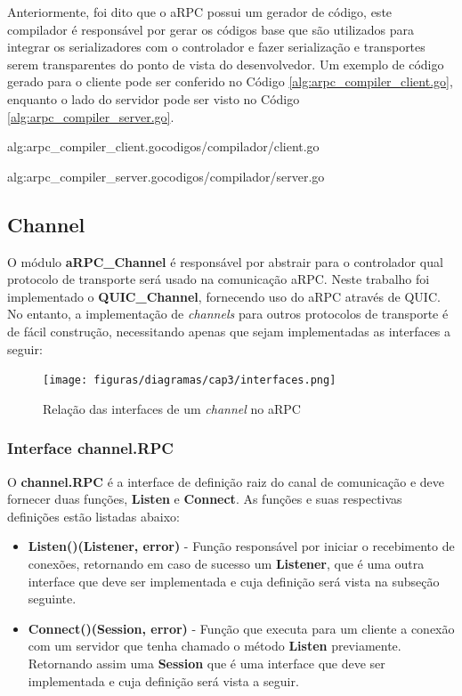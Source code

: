 Anteriormente, foi dito que o aRPC possui um gerador de código, este compilador é responsável por gerar os códigos base que são utilizados para integrar os serializadores com o controlador e fazer serialização e transportes serem transparentes do ponto de vista do desenvolvedor. Um exemplo de código gerado para o cliente pode ser conferido no Código \ref{alg:arpc_compiler_client.go}, enquanto o lado do servidor pode ser visto no Código \ref{alg:arpc_compiler_server.go}.

 {alg:arpc_compiler_client.go}{codigos/compilador/client.go}{}

 {alg:arpc_compiler_server.go}{codigos/compilador/server.go}{}

\subsection{Channel}

O módulo \textbf{aRPC\_Channel} é responsável por abstrair para o controlador qual protocolo de transporte será usado na comunicação aRPC. Neste trabalho foi implementado o \textbf{QUIC\_Channel}, fornecendo uso do aRPC através de QUIC. No entanto, a implementação de \textit{channels} para outros protocolos de transporte é de fácil construção, necessitando apenas que sejam implementadas as interfaces a seguir: 

\begin{figure}[ht]
    \centering
    \caption{Relação das interfaces de um \textit{channel} no aRPC}
    \texttt{[image: figuras/diagramas/cap3/interfaces.png]} 
    \label{fig:arpc_channel_interfaces}
\end{figure}

\subsubsection{Interface channel.RPC}

O \textbf{channel.RPC} é a interface de definição raiz do canal de comunicação e deve fornecer duas funções, \textbf{Listen} e \textbf{Connect}. As funções e suas respectivas definições estão listadas abaixo:

\begin{itemize}
	\item \textbf{Listen()(Listener, error)} - Função responsável por iniciar o recebimento de conexões, retornando em caso de sucesso um \textbf{Listener}, que é uma outra interface que deve ser implementada e cuja definição será vista na subseção seguinte.
	\item \textbf{Connect()(Session, error)} - Função que executa para um cliente a conexão com um servidor que tenha chamado o método \textbf{Listen} previamente. Retornando assim uma \textbf{Session} que é uma interface que deve ser implementada e cuja definição será vista a seguir.
\end{itemize}

